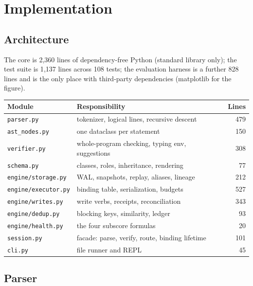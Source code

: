 \documentclass[11pt]{article}
\begin{document}
\section{Implementation}\label{sec:impl}

\subsection{Architecture}

The core is 2{,}360 lines of dependency-free Python (standard library only); the test suite is 1{,}137 lines across 108 tests; the evaluation harness is a further 828 lines and is the only place with third-party dependencies (matplotlib for the figure).

\begin{center}
\small
\begin{tabular}{llr}
\toprule
Module & Responsibility & Lines \\
\midrule
\texttt{parser.py} & tokenizer, logical lines, recursive descent & 479 \\
\texttt{ast\_nodes.py} & one dataclass per statement & 150 \\
\texttt{verifier.py} & whole-program checking, typing env, suggestions & 308 \\
\texttt{schema.py} & classes, roles, inheritance, rendering & 77 \\
\texttt{engine/storage.py} & WAL, snapshots, replay, aliases, lineage & 212 \\
\texttt{engine/executor.py} & binding table, serialization, budgets & 527 \\
\texttt{engine/writes.py} & write verbs, receipts, reconciliation & 343 \\
\texttt{engine/dedup.py} & blocking keys, similarity, ledger & 93 \\
\texttt{engine/health.py} & the four subscore formulas & 20 \\
\texttt{session.py} & facade: parse, verify, route, binding lifetime & 101 \\
\texttt{cli.py} & file runner and REPL & 45 \\
\bottomrule
\end{tabular}
\end{center}

\subsection{Parser}
\end{document}
